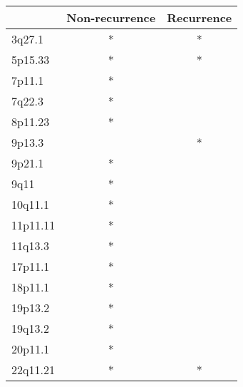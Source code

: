 \begin{tabular}{lcc}
\toprule
{} & Non-recurrence & Recurrence \\
\midrule
3q27.1   &              * &          * \\
5p15.33  &              * &          * \\
7p11.1   &              * &            \\
7q22.3   &              * &            \\
8p11.23  &              * &            \\
9p13.3   &                &          * \\
9p21.1   &              * &            \\
9q11     &              * &            \\
10q11.1  &              * &            \\
11p11.11 &              * &            \\
11q13.3  &              * &            \\
17p11.1  &              * &            \\
18p11.1  &              * &            \\
19p13.2  &              * &            \\
19q13.2  &              * &            \\
20p11.1  &              * &            \\
22q11.21 &              * &          * \\
\bottomrule
\end{tabular}
